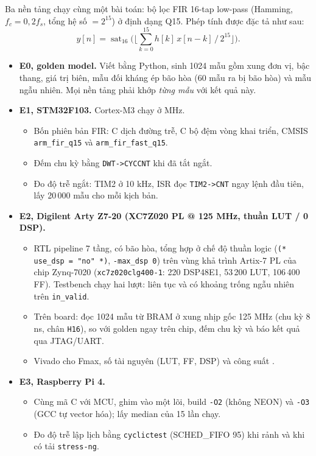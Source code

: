 \documentclass[11pt,a4paper]{article}
\begin{document}
Ba nền tảng chạy cùng một bài toán: bộ lọc FIR 16-tap low-pass (Hamming, $f_c=0{,}2f_s$, tổng hệ số $=2^{15}$) ở định dạng Q15. Phép tính được đặc tả như sau:
\[
y[n]=\operatorname{sat}_{16}\!\Big(\big\lfloor \textstyle\sum_{k=0}^{15} h[k]\,x[n-k] \,/\, 2^{15}\big\rfloor\Big).
\]

\begin{itemize}
\item \textbf{E0, golden model.} Viết bằng Python, sinh 1024 mẫu gồm xung đơn vị, bậc thang, giá trị biên, mẫu đối kháng ép bão hòa (60 mẫu ra bị bão hòa) và mẫu ngẫu nhiên. Mọi nền tảng phải khớp \emph{từng mẫu} với kết quả này.
\item \textbf{E1, \MCU{} STM32F103.} Cortex-M3 chạy ở \expMcuClock{} MHz.
  \begin{itemize}
  \item Bốn phiên bản FIR: C dịch đường trễ, C bộ đệm vòng khai triển, CMSIS \texttt{arm\_fir\_q15} và \texttt{arm\_fir\_fast\_q15}.
  \item Đếm chu kỳ bằng \texttt{DWT->CYCCNT} khi đã tắt ngắt.
  \item Đo độ trễ ngắt: TIM2 ở 10 kHz, ISR đọc \texttt{TIM2->CNT} ngay lệnh đầu tiên, lấy 20\,000 mẫu cho mỗi kịch bản.
  \end{itemize}
\item \textbf{E2, \FPGA{} Digilent Arty Z7-20 (XC7Z020 PL @ 125 MHz, thuần LUT / 0 DSP).}
  \begin{itemize}
  \item RTL pipeline 7 tầng, có bão hòa, tổng hợp ở chế độ thuần logic (\texttt{(* use\_dsp = "no" *)}, \texttt{-max\_dsp 0}) trên vùng khả trình Artix-7 PL của chip Zynq-7020 (\texttt{xc7z020clg400-1}: 220 DSP48E1, 53\,200 LUT, 106\,400 FF). Testbench chạy hai lượt: liên tục và có khoảng trống ngẫu nhiên trên \texttt{in\_valid}.
  \item Trên board: đọc 1024 mẫu từ BRAM ở xung nhịp gốc 125 MHz (chu kỳ 8 ns, chân \texttt{H16}), so với golden ngay trên chip, đếm chu kỳ và báo kết quả qua JTAG/UART.
  \item Vivado cho Fmax, số tài nguyên (LUT, FF, DSP) và công suất .
  \end{itemize}
\item \textbf{E3, \SoC{} Raspberry Pi 4.}
  \begin{itemize}
  \item Cùng mã C với MCU, ghim vào một lõi, build \texttt{-O2} (không NEON) và \texttt{-O3} (GCC tự vector hóa); lấy median của 15 lần chạy.
  \item Đo độ trễ lập lịch bằng \texttt{cyclictest} (SCHED\_FIFO 95) khi rảnh và khi có tải \texttt{stress-ng}.

\end{itemize}
\end{itemize}
\end{document}

